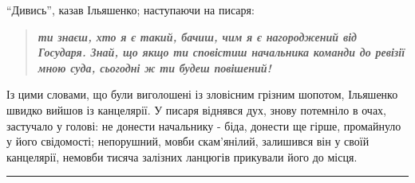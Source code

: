 \documentclass[a4paper,20pt]{report}
\begin{document}
``Дивись'', казав Ільяшенко; наступаючи на писаря:
\begin{quote}
\em\bfseries	
ти знаєш, хто я є такий, бачиш, чим я є нагороджений від Государя. Знай, що якщо ти 
сповістиш начальника команди до ревізії мною суда, сьогодні ж ти будеш повішений!
\end{quote}

Із цими словами, що були виголошені із зловісним грізним шопотом, Ільяшенко
швидко вийшов із канцелярії. У писаря віднявся дух, знову потемніло в очах,
застучало у голові: не донести начальнику - біда, донести ще гірше, промайнуло
у його свідомості; непорушний, мовби скам'янілий, залишився він у своїй
канцелярії, немовби тисяча залізних ланцюгів прикували його до місця.





\par\noindent\rule{\textwidth}{0.4pt}
\end{document}
